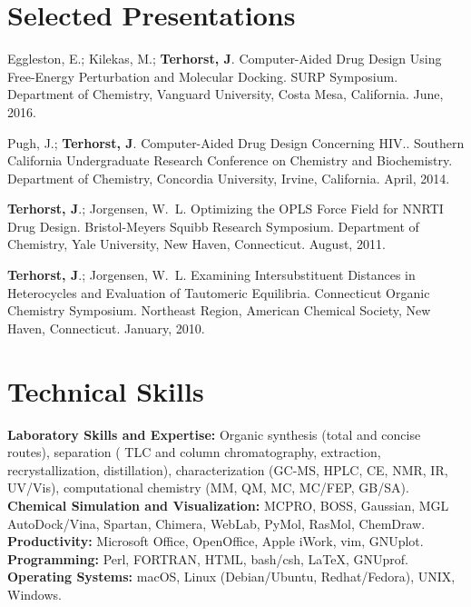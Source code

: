 \documentclass[10pt]{article}
\newcommand*\pres[8]{#1 #2. #3. #4, #5, #6. #7, #8.}
\begin{document}
\section{Selected Presentations}


\pres{Eggleston, E.; Kilekas, M.; \textbf{Terhorst, J}.}
{Computer-Aided Drug Design Using Free-Energy Perturbation and Molecular Docking}
{SURP Symposium}
{Department of Chemistry}
{Vanguard University}
{Costa Mesa, California}
{June}{2016}

\pres{Pugh, J.; \textbf{Terhorst, J}.}
{Computer-Aided Drug Design Concerning HIV.}
{Southern California Undergraduate Research Conference on Chemistry and Biochemistry}
{Department of Chemistry}
{Concordia University}
{Irvine, California}
{April}{2014}

\pres{\textbf{Terhorst, J}.; Jorgensen, W.\ L.}
{Optimizing the OPLS Force Field for NNRTI Drug Design}
{Bristol-Meyers Squibb Research Symposium}
{Department of Chemistry}
{Yale University}
{New Haven, Connecticut}
{August}{2011}

\pres{\textbf{Terhorst, J}.; Jorgensen, W.\ L.}
{Examining Intersubstituent Distances in Heterocycles and Evaluation of Tautomeric Equilibria}
{Connecticut Organic Chemistry Symposium}
{Northeast Region}
{American Chemical Society}
{New Haven, Connecticut}
{January}{2010}


\section{Technical Skills}


\textbf{Laboratory Skills and Expertise:} Organic synthesis (total and concise routes), separation (%
TLC and column chromatography, extraction, recrystallization, distillation), characterization (GC-MS, HPLC, CE, NMR, IR, UV/Vis), computational chemistry (MM, QM, MC, MC/FEP, GB/SA). \textbf{Chemical Simulation and Visualization:} MCPRO, BOSS, Gaussian, MGL AutoDock/Vina, Spartan, Chimera, WebLab, PyMol, RasMol, ChemDraw. \textbf{Productivity:} Microsoft Office, OpenOffice, Apple iWork, vim, GNUplot. \textbf{Programming:} Perl, FORTRAN, HTML, bash/csh, \LaTeX, GNUprof. \textbf{Operating Systems:} macOS, Linux (Debian/Ubuntu, Redhat/Fedora), UNIX, Windows.
\end{document}
